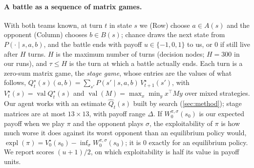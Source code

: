 \documentclass[10pt]{article}
\theoremstyle{tplain}
\theoremstyle{tdef}
\theoremstyle{trem}
\newcommand{\Qhat}{\hat Q}
\newcommand{\Qstar}{Q^\star}
\newcommand{\Vstar}{V^\star}
\DeclareMathOperator{\val}{val}
\DeclareMathOperator{\expl}{expl}
\begin{document}
\paragraph{A battle as a sequence of matrix games.} With both teams known, at turn $t$ in state $s$ we (Row) choose $a\in A(s)$ and the opponent (Column) chooses $b\in B(s)$; chance draws the next state from $P(\cdot\mid s,a,b)$, and the battle ends with payoff $u\in\{-1,0,1\}$ to us, or $0$ if still live after $H$ turns. $H$ is the maximum number of turns (decision nodes; $H=300$ in our runs), and $\tau\le H$ is the turn at which a battle actually ends. Each turn is a zero-sum matrix game, the \emph{stage game}, whose entries are the values of what follows, $\Qstar_t(s)(a,b)=\sum_{s'}P(s'\mid s,a,b)\,\Vstar_{t+1}(s')$, with $\Vstar_t(s)=\val\Qstar_t(s)$ and $\val(M)=\max_x\min_yx^\top My$ over mixed strategies. Our agent works with an estimate $\Qhat_t(s)$ built by search (\cref{sec:method}); stage matrices are at most $13\times13$, with payoff range $\Delta$. If $W^{\pi,\sigma}_0(s_0)$ is our expected payoff when we play $\pi$ and the opponent plays $\sigma$, the exploitability of $\pi$ is how much worse it does against its worst opponent than an equilibrium policy would, $\expl(\pi)=\Vstar_0(s_0)-\inf_\sigma W^{\pi,\sigma}_0(s_0)$; it is $0$ exactly for an equilibrium policy. We report scores $(u+1)/2$, on which exploitability is half its value in payoff units.
\end{document}
